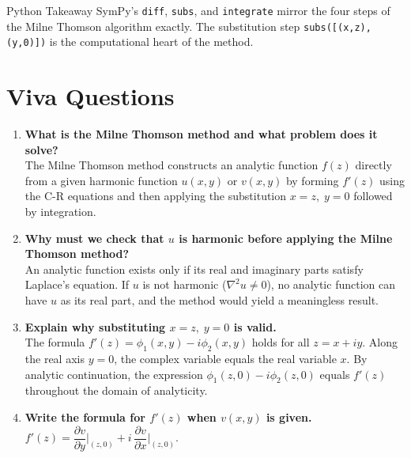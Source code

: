 \documentclass[12pt,a4paper]{article}
\begin{document}
\begin{learnbox}{Python Takeaway}
SymPy's \texttt{diff}, \texttt{subs}, and \texttt{integrate} mirror the four steps of the Milne Thomson algorithm exactly. The substitution step \texttt{subs([(x,z),(y,0)])} is the computational heart of the method.
\end{learnbox}

\section{Viva Questions}

\begin{enumerate}
  \item \textbf{What is the Milne Thomson method and what problem does it solve?}\\
  The Milne Thomson method constructs an analytic function \( f(z) \) directly from a given harmonic function \( u(x,y) \) or \( v(x,y) \) by forming \( f'(z) \) using the C-R equations and then applying the substitution \( x = z,\; y = 0 \) followed by integration.

  \item \textbf{Why must we check that \( u \) is harmonic before applying the Milne Thomson method?}\\
  An analytic function exists only if its real and imaginary parts satisfy Laplace's equation. If \( u \) is not harmonic (\( \nabla^2 u \neq 0 \)), no analytic function can have \( u \) as its real part, and the method would yield a meaningless result.

  \item \textbf{Explain why substituting \( x = z,\; y = 0 \) is valid.}\\
  The formula \( f'(z) = \phi_1(x,y) - i\phi_2(x,y) \) holds for all \( z = x+iy \). Along the real axis \( y=0 \), the complex variable equals the real variable \( x \). By analytic continuation, the expression \( \phi_1(z,0) - i\phi_2(z,0) \) equals \( f'(z) \) throughout the domain of analyticity.

  \item \textbf{Write the formula for \( f'(z) \) when \( v(x,y) \) is given.}\\
  \( f'(z) = \dfrac{\partial v}{\partial y}\bigg|_{(z,0)} + i\,\dfrac{\partial v}{\partial x}\bigg|_{(z,0)} \).


\end{enumerate}
\end{document}
